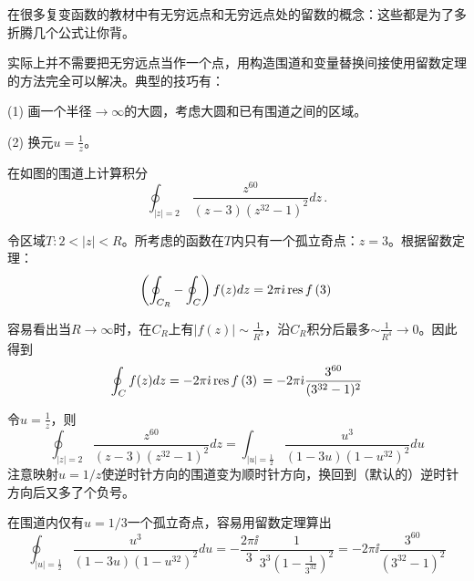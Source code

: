 \documentclass[CJK]{beamer}
\begin{document}
\begin{frame}
\bch
在很多复变函数的教材中有无穷远点和无穷远点处的留数的概念：这些都是为了多折腾几个公式让你背\bye。

\skiplines

实际上并不需要把无穷远点当作一个点，用构造围道和变量替换间接使用留数定理的方法完全可以解决。典型的技巧有：
\bitem
\item[(1)]{画一个半径$\rightarrow \infty$的大圆，考虑大圆和已有围道之间的区域。}
\item[(2)]{换元$u=\frac{1}{z}$。}
\eitem
\ech
\end{frame}

\begin{frame}
\chtitle{\proid (\stwo)}
\bch
{}
在如图的围道上计算积分
$$\oint_{|z|=2}\,\frac{z^{60}}{(z-3)\left(z^{32}-1\right)^2} dz\,. $$
\ech
\end{frame}

\begin{frame}
\bch
{}

令区域$T: 2<|z|<R$。所考虑的函数在$T$内只有一个孤立奇点：$z=3$。根据留数定理：
$$\left(\oint_{C_R} - \oint_C\right) f(z) dz = 2\pi{\dot{\imath}}\,\mathrm{res}\,f\left(3\right)\, $$
\ech
\end{frame}

\begin{frame}
\bch
{}
容易看出当$R\rightarrow \infty$时，在$C_R$上有$|f(z)|\sim \frac{1}{R^5}$，沿$C_R$积分后最多$\sim \frac{1}{R^4} \rightarrow 0$。因此得到
$$ \oint_C f(z) dz  = -2\pi{\dot{\imath}} \,\mathrm{res}\,f\left(3\right)\, = -2\pi{\dot{\imath}}\frac{3^{60}}{(3^{32}-1)^2} $$
\ech
\end{frame}


\begin{frame}
\bch
令$u = \frac{1}{z}$，则
$$\oint_{|z|=2} \frac{z^{60}}{(z-3)\left(z^{32}-1\right)^2} dz = \int_{|u|=\frac{1}{2}} \frac{u^3}{(1-3u)\left(1-u^{32}\right)^2} du $$
{\scriptsize 注意映射$u=1/z$使逆时针方向的围道变为顺时针方向，换回到（默认的）逆时针方向后又多了个负号。}

在围道内仅有$u=1/3$一个孤立奇点，容易用留数定理算出
$$ \oint_{|u|=\frac{1}{2}} \frac{u^3}{(1-3u)\left(1-u^{32}\right)^2} du = -\frac{2\pi\ii}{3} \frac{1}{3^3\left(1-\frac{1}{3^{32}}\right)^2} = -2\pi\ii \frac{3^{60}}{\left(3^{32}-1\right)^2} $$

\ech
\end{frame}
\end{document}
